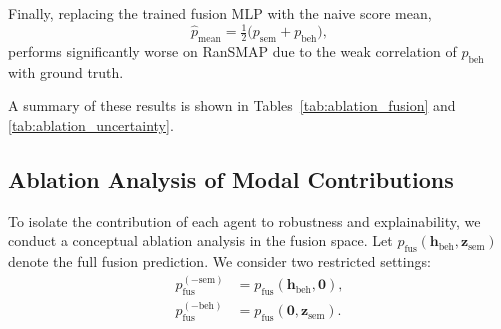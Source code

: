 \documentclass[lettersize,journal]{IEEEtran}
\begin{document}
Finally, replacing the trained fusion MLP with the naive score mean,
\begin{equation}
\hat{p}_{\mathrm{mean}} = \tfrac{1}{2} \bigl( p_{\mathrm{sem}} + p_{\mathrm{beh}} \bigr),
\label{eq:mean_fusion}
\end{equation}
performs significantly worse on RanSMAP due to the weak correlation of \(p_{\mathrm{beh}}\) with ground truth.

A summary of these results is shown in Tables~\ref{tab:ablation_fusion} and \ref{tab:ablation_uncertainty}.

\begin{table}[ht]
\centering
{}
\caption{Ablation of fusion strategies.}
\label{tab:ablation_fusion}
\end{table}

\begin{table}[ht]
\centering
{}
\caption{Effect of removing uncertainty terms on triage performance.}
\label{tab:ablation_uncertainty}
\end{table}

\subsection{Ablation Analysis of Modal Contributions}

To isolate the contribution of each agent to robustness and explainability, we conduct a conceptual ablation analysis in the fusion space.
Let $p_{\mathrm{fus}}(\mathbf{h}_{\mathrm{beh}}, \mathbf{z}_{\mathrm{sem}})$ denote the full fusion prediction.
We consider two restricted settings:
\begin{align}
p_{\mathrm{fus}}^{(-\mathrm{sem})} &= p_{\mathrm{fus}}(\mathbf{h}_{\mathrm{beh}}, \mathbf{0}),
\label{eq:ablate_sem} \\
p_{\mathrm{fus}}^{(-\mathrm{beh})} &= p_{\mathrm{fus}}(\mathbf{0}, \mathbf{z}_{\mathrm{sem}}).
\label{eq:ablate_beh}
\end{align}
\end{document}
